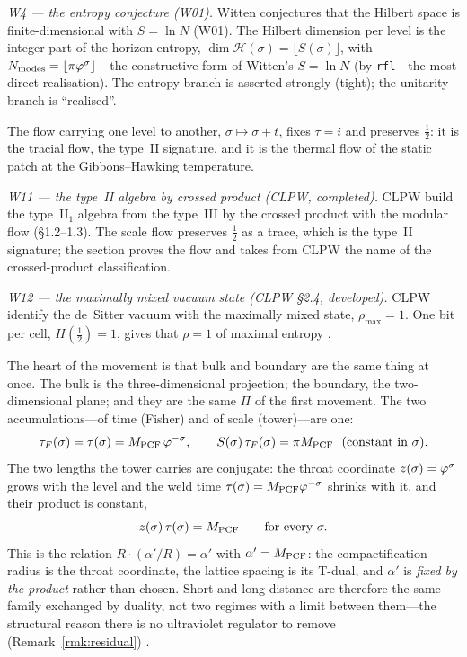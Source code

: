 \emph{W4 --- the entropy conjecture (W01).} Witten conjectures that the Hilbert space is
finite-dimensional with $S=\ln N$ (W01). The Hilbert dimension per level is the integer
part of the horizon entropy, $\dim\mathcal{H}(\sigma)=\lfloor S(\sigma)\rfloor$, with
$N_{\rm modes}=\lfloor\pi\varphi^\sigma\rfloor$---the constructive form of Witten's
$S=\ln N$ (by \texttt{rfl}---the most direct realisation).
The entropy
branch is asserted strongly (tight); the unitarity branch is ``realised''.


The flow carrying one level to another, $\sigma\mapsto\sigma+t$, fixes $\tau=i$ and
preserves $\tfrac12$: it is the tracial flow, the type~II signature, and it is the thermal
flow of the static patch at the Gibbons--Hawking temperature.


\emph{W11 --- the type~II algebra by crossed product (CLPW, completed).} CLPW build the
type~II$_1$ algebra from the type~III by the crossed product with the modular flow
(\S1.2--1.3). The scale flow preserves $\tfrac12$ as a trace, which is the type~II
signature; the section proves the flow and takes from CLPW the name of the crossed-product
classification.


\emph{W12 --- the maximally mixed vacuum state (CLPW \S2.4, developed).} CLPW identify the
de~Sitter vacuum with the maximally mixed state, $\rho_{\max}=1$. One bit per cell,
$H(\tfrac12)=1$, gives that $\rho=1$ of maximal entropy .

The heart of the movement is that bulk and boundary are the same thing at once. The bulk
is the three-dimensional projection; the boundary, the two-dimensional plane; and they are
the same $\Pi$ of the first movement. The two accumulations---of time (Fisher) and of
scale (tower)---are one:
\begin{equation}\label{eq:obs-weld}
  \tau_F(\sigma)=\tau(\sigma)=M_{\mathrm{PCF}}\,\varphi^{-\sigma},\qquad
  S(\sigma)\,\tau_F(\sigma)=\pi M_{\mathrm{PCF}}\ \ (\text{constant in }\sigma).
\end{equation}
The two lengths the tower carries are conjugate: the throat coordinate $z(\sigma)=\varphi^{\sigma}$
grows with the level and the weld time $\tau(\sigma)=M_{\mathrm{PCF}}\varphi^{-\sigma}$ shrinks with it, and
their product is constant,
\begin{equation}\label{eq:conjugate-pair}
  z(\sigma)\,\tau(\sigma)=M_{\mathrm{PCF}}\qquad\text{for every }\sigma .
\end{equation}
This is the relation $R\cdot(\alpha'/R)=\alpha'$ with $\alpha'=M_{\mathrm{PCF}}$: the compactification radius is
the throat coordinate, the lattice spacing is its T-dual, and $\alpha'$ is \emph{fixed by the product}
rather than chosen. Short and long distance are therefore the same family exchanged by duality, not two
regimes with a limit between them---the structural reason there is no ultraviolet regulator to remove
(Remark~\ref{rmk:residual}) .

